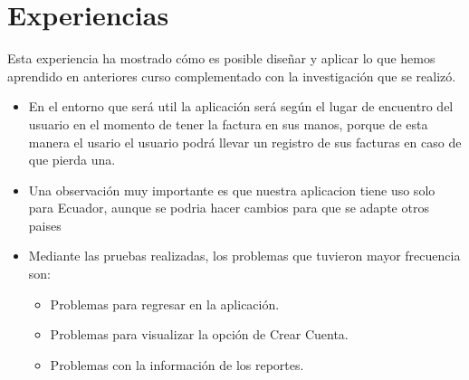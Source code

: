 \section{ Experiencias}
 Esta experiencia ha mostrado cómo es posible diseñar y aplicar lo que hemos aprendido en anteriores curso complementado con la investigación que se realizó.
\begin{itemize}
\item En el entorno que será util la aplicación será según el lugar de encuentro del usuario en el momento de tener la factura en sus manos, porque de esta manera el usario el usuario podrá llevar un registro de sus facturas en caso de que pierda una.
\item Una observación muy importante es que nuestra aplicacion tiene uso solo para Ecuador, aunque se podria hacer cambios para  que se adapte otros paises 
\item Mediante las pruebas realizadas, los problemas que tuvieron  mayor frecuencia son:
  \begin{itemize}
\item Problemas para regresar en la aplicación.
\item Problemas para visualizar la opción de Crear Cuenta.
\item Problemas con  la información de los reportes.
   \end{itemize}
\end{itemize}



